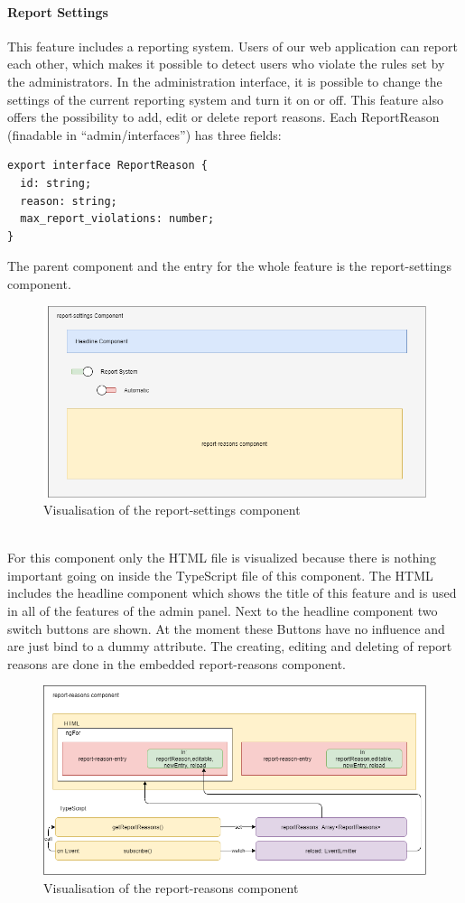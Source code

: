 \paragraph{Report Settings}
This feature includes a reporting system. Users of our web application can report each other, which makes it possible to detect users who violate the rules set by the administrators. In the administration interface, it is possible to change the settings of the current reporting system and turn it on or off. This feature also offers the possibility to add, edit or delete report reasons. Each ReportReason (finadable in \enquote{admin/interfaces}) has three fields:
\begin{verbatim}
export interface ReportReason {
  id: string;
  reason: string;
  max_report_violations: number;
}
\end{verbatim}
The parent component and the entry for the whole feature is the report-settings component.
\begin{figure}[h]
    \centering
    \includegraphics[width=1.0\textwidth]{./images/report_settings_1}
    \caption{Visualisation of the report-settings component}
    \label{fig:reportset}
\end{figure}
\\
For this component only the HTML file is visualized because there is nothing important going on inside the TypeScript file of this component. The HTML includes the headline component which shows the title of this feature and is used in all of the features of the admin panel. Next to the headline component two switch buttons are shown. At the moment these Buttons have no influence and are just bind to a dummy attribute. The creating, editing and deleting of report reasons are done in the embedded report-reasons component.
\begin{figure}[h]
    \centering
    \includegraphics[width=1.0\textwidth]{./images/report_reasons_2}
    \caption{Visualisation of the report-reasons component}
    \label{fig:reportreason}
\end{figure}
